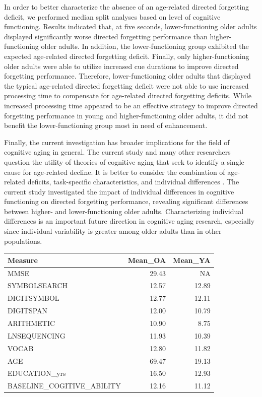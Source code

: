 \documentclass[man]{apa6}
\begin{document}
In order to better characterize the absence of an age-related directed forgetting deficit, we performed median split analyses based on level of cognitive functioning. Results indicated that, at five seconds, lower-functioning older adults displayed significantly worse directed forgetting performance than higher-functioning older adults. In addition, the lower-functioning group exhibited the expected age-related directed forgetting deficit. Finally, only higher-functioning older adults were able to utilize increased cue durations to improve directed forgetting performance. Therefore, lower-functioning older adults that displayed the typical age-related directed forgetting deficit were not able to use increased processing time to compensate for age-related directed forgetting deficits. While increased processing time appeared to be an effective strategy to improve directed forgetting performance in young and higher-functioning older adults, it did not benefit the lower-functioning group most in need of enhancement.

Finally, the current investigation has broader implications for the field of cognitive aging in general. The current study and many other researchers question the utility of theories of cognitive aging that seek to identify a single cause for age-related decline. It is better to consider the combination of age-related deficits, task-specific characteristics, and individual differences \parencite{albinet.et.al2012}. The current study investigated the impact of individual differences in cognitive functioning on directed forgetting performance, revealing significant differences between higher- and lower-functioning older adults. Characterizing individual differences is an important future direction in cognitive aging research, especially since individual variability is greater among older adults than in other populations.

\printbibliography


\begin{table}[ht]
\begin{center}
\begin{tabular}{lrr}
\hline
Measure & Mean_OA & Mean_YA \\
\hline
MMSE & 29.43 & NA \\
SYMBOLSEARCH & 12.57 & 12.89 \\
DIGITSYMBOL & 12.77 & 12.11 \\
DIGITSPAN & 12.00 & 10.79 \\
ARITHMETIC & 10.90 &  8.75 \\
LNSEQUENCING & 11.93 & 10.39 \\
VOCAB & 12.80 & 11.82 \\
AGE & 69.47 & 19.13 \\
EDUCATION_yrs & 16.50 & 12.93 \\
BASELINE_COGITIVE_ABILITY & 12.16 & 11.12 \\
\hline
\end{tabular}
\end{center}
\end{table}
\end{document}
